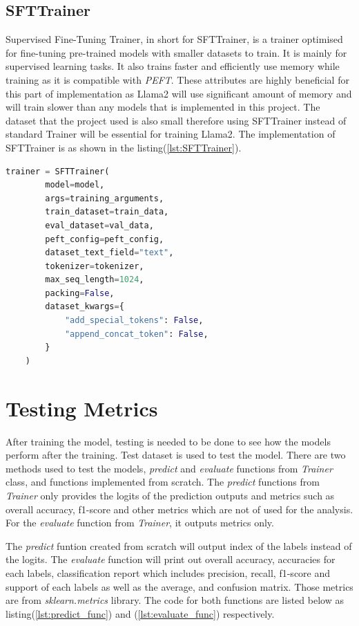 \subsection{SFTTrainer}
Supervised Fine-Tuning Trainer, in short for SFTTrainer, is a trainer optimised for fine-tuning pre-trained models with smaller datasets to train\cite{Mudadla_2023}. It is mainly for supervised learning tasks\cite{Mudadla_2023}. It also trains faster and efficiently use memory while training as it is compatible with \textit{PEFT}\cite{Mudadla_2023}. These attributes are highly beneficial for this part of implementation as Llama2 will use significant amount of memory and will train slower than any models that is implemented in this project. The dataset that the project used is also small therefore using SFTTrainer instead of standard Trainer will be essential for training Llama2. The implementation of SFTTrainer is as shown in the listing(\ref{lst:SFTTrainer}).

\begin{lstlisting}[language=Python, caption=The code for SFTTrainer, label=lst:SFTTrainer]
    trainer = SFTTrainer(
        model=model,
        args=training_arguments,
        train_dataset=train_data,
        eval_dataset=val_data,
        peft_config=peft_config,
        dataset_text_field="text",
        tokenizer=tokenizer,
        max_seq_length=1024,
        packing=False,
        dataset_kwargs={
            "add_special_tokens": False,
            "append_concat_token": False,
        }
    )
\end{lstlisting}

\section{Testing Metrics}
After training the model, testing is needed to be done to see how the models perform after the training. Test dataset is used to test the model. There are two methods used to test the models, \textit{predict} and \textit{evaluate} functions from \textit{Trainer} class, and functions implemented from scratch. The \textit{predict} functions from \textit{Trainer} only provides the logits of the prediction outputs and metrics such as overall accuracy, f1-score and other metrics which are not of used for the analysis. For the \textit{evaluate} function from \textit{Trainer}, it outputs metrics only.

The \textit{predict} funtion created from scratch will output index of the labels instead of the logits. The \textit{evaluate} function will print out overall accuracy, accuracies for each labels, classification report which includes precision, recall, f1-score and support of each labels as well as the average, and confusion matrix. Those metrics are from \textit{sklearn.metrics} library. The code for both functions are listed below as listing(\ref{lst:predict_func}) and (\ref{lst:evaluate_func}) respectively.

